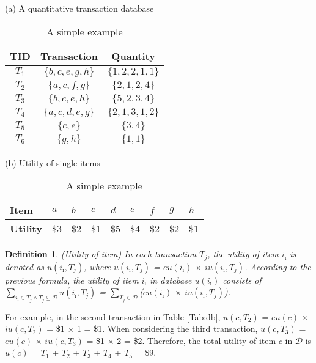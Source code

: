 \documentclass[journal]{IEEEtran}
\newtheorem{definition}{Definition}[section]
\begin{document}
\begin{table}[!h]
	\centering
	\caption{A simple example}
	\label{Tab:db}
	\centerline{(a) A quantitative transaction database}
	
	\begin{tabular}{ccc}
		\hline
		\textbf{TID} & \textbf{Transaction} & \textbf{Quantity}  \\ \hline
		$T_1$    	 & $\{b,c,e,g,h\}$  	& $\{1,2,2,1,1\}$ \\
		$T_2$    	 & $\{a,c,f,g\}$  		& $\{2,1,2,4\}$	  \\
		$T_3$    	 & $\{b,c,e,h\}$    	& $\{5,2,3,4\}$   \\
		$T_4$    	 & $\{a,c,d,e,g\}$ 	    & $\{2,1,3,1,2\}$ \\
		$T_5$    	 & $\{c,e\}$    		& $\{3,4\}$		  \\
		$T_6$    	 & $\{g,h\}$     		& $\{1,1\}$	      \\
		\hline
	\end{tabular}
	
	\vspace{3mm}
	
	\centerline{(b) Utility of single items}
	\label{Tab:profit}
	\begin{tabular}{lllllllll}
		\hline
		\textbf{Item} 	 & $a$   & $b$ 	 & $c$   & $d$   & $e$   & $f$   & $g$   & $h$   \\ \hline
		\textbf{Utility} & \$3 & \$2 & \$1 & \$5 & \$4 & \$2 & \$2 & \$1 \\ \hline
	\end{tabular}	
\end{table}



\begin{definition}
	\rm  (\textit{Utility of item}) In each transaction $T_j$, the utility of item $i_\imath$ is denoted as $u(i_\imath, T_j)$, where $u(i_\imath, T_j)$ = $eu(i_\imath)$ $\times$ $iu(i_\imath, T_j)$. According to the previous formula, the utility of item $i_\imath$ in database $u(i_\imath)$ consists of $\sum_{i_\imath \in T_j \land T_j \subseteq \mathcal{D}}$$u(i_\imath, T_j)$ = $\sum_{T_j \in \mathcal{D}}$($eu(i_\imath)$ $\times$ $iu(i_\imath, T_j)$).
\end{definition}

For example, in the second transaction in Table \ref{Tab:db}, $u(c, T_2)$ = $eu(c)$ $\times$ $iu(c, T_2)$ = \$1 $\times$ 1 = \$1. When considering the third transaction, $u(c, T_3)$ = $eu(c)$ $\times$ $iu(c, T_3)$ = \$1 $\times$ 2 = \$2. Therefore, the total utility of item $c$ in $ \mathcal{D}$ is $u(c)$ = $T_1$ + $T_2$ + $T_3$ + $T_4$ + $T_5$ = \$9.
\end{document}
